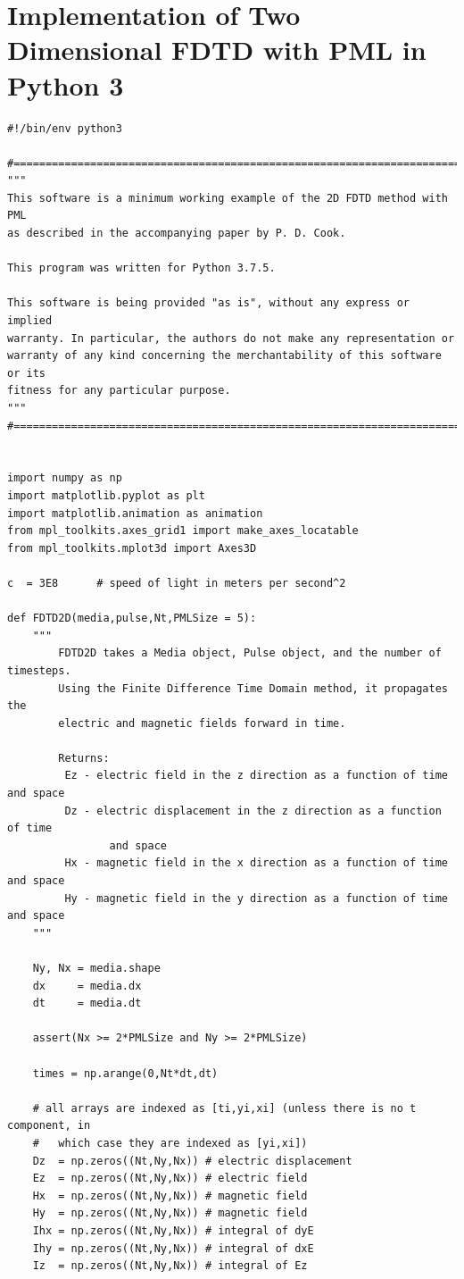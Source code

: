 \documentclass[12pt]{article}
\begin{document}
\section{Implementation of Two Dimensional FDTD with PML in Python 3}
\label{ap:Code}
\begin{verbatim}
#!/bin/env python3

#=============================================================================#
"""
This software is a minimum working example of the 2D FDTD method with PML
as described in the accompanying paper by P. D. Cook.

This program was written for Python 3.7.5.

This software is being provided "as is", without any express or implied
warranty. In particular, the authors do not make any representation or
warranty of any kind concerning the merchantability of this software or its
fitness for any particular purpose.
"""
#=============================================================================#


import numpy as np
import matplotlib.pyplot as plt
import matplotlib.animation as animation
from mpl_toolkits.axes_grid1 import make_axes_locatable
from mpl_toolkits.mplot3d import Axes3D

c  = 3E8      # speed of light in meters per second^2

def FDTD2D(media,pulse,Nt,PMLSize = 5):
    """
        FDTD2D takes a Media object, Pulse object, and the number of timesteps.
        Using the Finite Difference Time Domain method, it propagates the
        electric and magnetic fields forward in time.

        Returns:
         Ez - electric field in the z direction as a function of time and space
         Dz - electric displacement in the z direction as a function of time
                and space
         Hx - magnetic field in the x direction as a function of time and space
         Hy - magnetic field in the y direction as a function of time and space
    """

    Ny, Nx = media.shape
    dx     = media.dx
    dt     = media.dt

    assert(Nx >= 2*PMLSize and Ny >= 2*PMLSize)

    times = np.arange(0,Nt*dt,dt)

    # all arrays are indexed as [ti,yi,xi] (unless there is no t component, in
    #   which case they are indexed as [yi,xi])
    Dz  = np.zeros((Nt,Ny,Nx)) # electric displacement
    Ez  = np.zeros((Nt,Ny,Nx)) # electric field
    Hx  = np.zeros((Nt,Ny,Nx)) # magnetic field
    Hy  = np.zeros((Nt,Ny,Nx)) # magnetic field
    Ihx = np.zeros((Nt,Ny,Nx)) # integral of dyE
    Ihy = np.zeros((Nt,Ny,Nx)) # integral of dxE
    Iz  = np.zeros((Nt,Ny,Nx)) # integral of Ez


\end{verbatim}
\end{document}
